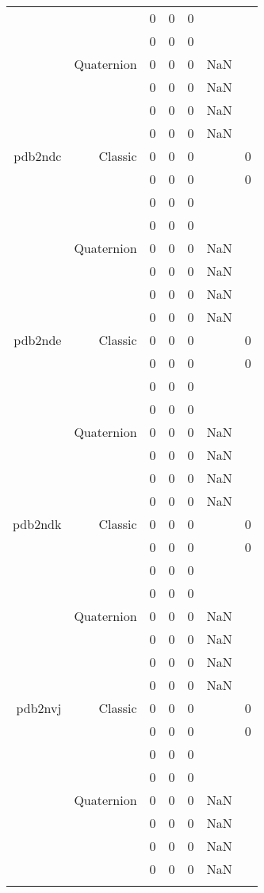 \begin{xltabular}{\textwidth}{r|rcccSc}
& & 0 & 0 & 0 & & \\
& & 0 & 0 & 0 & & \\
& Quaternion & 0 & 0 & 0 & NaN & \\
& & 0 & 0 & 0 & NaN & \\
& & 0 & 0 & 0 & NaN & \\
& & 0 & 0 & 0 & NaN & \\ \addlinespace
pdb2ndc & Classic & 0 & 0 & 0 & & 0 \\
& & 0 & 0 & 0 & & 0 \\
& & 0 & 0 & 0 & & \\
& & 0 & 0 & 0 & & \\
& Quaternion & 0 & 0 & 0 & NaN & \\
& & 0 & 0 & 0 & NaN & \\
& & 0 & 0 & 0 & NaN & \\
& & 0 & 0 & 0 & NaN & \\ \addlinespace
pdb2nde & Classic & 0 & 0 & 0 & & 0 \\
& & 0 & 0 & 0 & & 0 \\
& & 0 & 0 & 0 & & \\
& & 0 & 0 & 0 & & \\
& Quaternion & 0 & 0 & 0 & NaN & \\
& & 0 & 0 & 0 & NaN & \\
& & 0 & 0 & 0 & NaN & \\
& & 0 & 0 & 0 & NaN & \\ \addlinespace
pdb2ndk & Classic & 0 & 0 & 0 & & 0 \\
& & 0 & 0 & 0 & & 0 \\
& & 0 & 0 & 0 & & \\
& & 0 & 0 & 0 & & \\
& Quaternion & 0 & 0 & 0 & NaN & \\
& & 0 & 0 & 0 & NaN & \\
& & 0 & 0 & 0 & NaN & \\
& & 0 & 0 & 0 & NaN & \\ \addlinespace
pdb2nvj & Classic & 0 & 0 & 0 & & 0 \\
& & 0 & 0 & 0 & & 0 \\
& & 0 & 0 & 0 & & \\
& & 0 & 0 & 0 & & \\
& Quaternion & 0 & 0 & 0 & NaN & \\
& & 0 & 0 & 0 & NaN & \\
& & 0 & 0 & 0 & NaN & \\
& & 0 & 0 & 0 & NaN & \\ \addlinespace

\end{xltabular}
